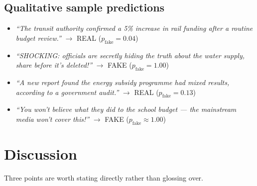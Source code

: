 \documentclass[12pt]{article}
\begin{document}
\subsection{Qualitative sample predictions}
\begin{itemize}[leftmargin=1.4em]
\item \emph{``The transit authority confirmed a 5\% increase in rail funding after a routine budget review.''} $\to$ REAL ($p_{\text{fake}}=0.04$)
\item \emph{``SHOCKING: officials are secretly hiding the truth about the water supply, share before it's deleted!''} $\to$ FAKE ($p_{\text{fake}}=1.00$)
\item \emph{``A new report found the energy subsidy programme had mixed results, according to a government audit.''} $\to$ REAL ($p_{\text{fake}}=0.13$)
\item \emph{``You won't believe what they did to the school budget --- the mainstream media won't cover this!''} $\to$ FAKE ($p_{\text{fake}}\approx 1.00$)
\end{itemize}

\section{Discussion}
Three points are worth stating directly rather than glossing over.
\end{document}
